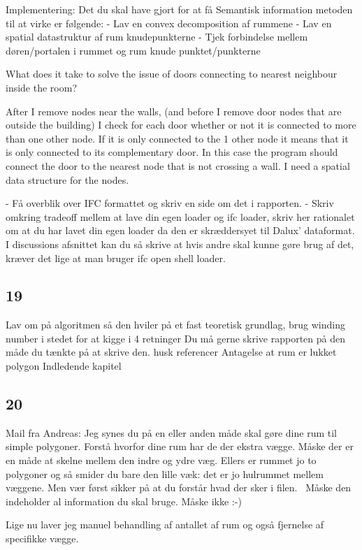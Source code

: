 Implementering:
Det du skal have gjort for at få Semantisk information metoden til at virke er følgende:
- Lav en convex decomposition af rummene
- Lav en spatial datastruktur af rum knudepunkterne
- Tjek forbindelse mellem døren/portalen i rummet og rum knude punktet/punkterne

What does it take to solve the issue of doors connecting to nearest neighbour inside the room?

After I remove nodes near the walls, (and before I remove door nodes that are outside the building) I check for each door whether or not it is connected to more than one other node. If it is only connected to the 1 other node it means that it is only connected to its complementary door. In this case the program should connect the door to the nearest node that is not crossing a wall. I need a spatial data structure for the nodes.


- Få overblik over IFC formattet og skriv en side om det i rapporten.
- Skriv omkring tradeoff mellem at lave din egen loader og ifc loader, skriv her rationalet om at du har lavet din egen loader da den er skræddersyet til Dalux' dataformat. I discussions afsnittet kan du så skrive at hvis andre skal kunne gøre brug af det, kræver det lige at man bruger ifc open shell loader.

\subsection{19}
Lav om på algoritmen så den hviler på et fast teoretisk grundlag, brug winding number i stedet for at kigge i 4 retninger
Du må gerne skrive rapporten på den måde du tænkte på at skrive den.
husk referencer
Antagelse at rum er lukket polygon
Indledende kapitel 

\subsection{20}
Mail fra Andreas:
Jeg synes du på en eller anden måde skal gøre dine rum til simple polygoner. Forstå hvorfor dine rum har de der ekstra vægge. Måske der er en måde at skelne mellem den indre og ydre væg. Ellers er rummet jo to polygoner og så smider du bare den lille væk: det er jo hulrummet mellem væggene. Men vær først sikker på at du forstår hvad der sker i filen.  Måske den indeholder al information du skal bruge. Måske ikke :-)

Lige nu laver jeg manuel behandling af antallet af rum og også fjernelse af specifikke vægge.

